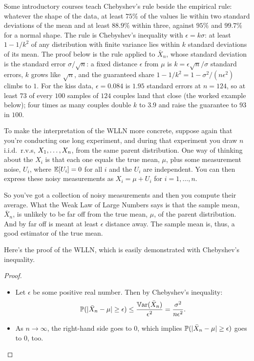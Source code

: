 \begin{bridge}
Some introductory courses teach Chebyshev's rule beside the empirical rule: whatever the shape of the data, at least $75\%$ of the values lie within two standard deviations of the mean and at least $88.9\%$ within three, against $95\%$ and $99.7\%$ for a normal shape.
The rule is Chebyshev's inequality with $\epsilon = k\sigma$: at least $1 - 1/k^2$ of any distribution with finite variance lies within $k$ standard deviations of its mean.
The proof below is the rule applied to $\bar{X}_n$, whose standard deviation is the standard error $\sigma/\sqrt{n}$: a fixed distance $\epsilon$ from $\mu$ is $k = \epsilon\sqrt{n}/\sigma$ standard errors, $k$ grows like $\sqrt{n}$, and the guaranteed share $1 - 1/k^2 = 1 - \sigma^2/(n\epsilon^2)$ climbs to $1$.
For the kiss data, $\epsilon = 0.084$ is $1.95$ standard errors at $n = 124$, so at least $73$ of every $100$ samples of $124$ couples land that close (the worked example below); four times as many couples double $k$ to $3.9$ and raise the guarantee to $93$ in $100$.
\end{bridge}

To make the interpretation of the WLLN more concrete, suppose again that you're conducting one long experiment, and during that experiment you draw $n$ i.i.d.\ r.v.s, $X_1, \ldots, X_n$, from the same parent distribution.
One way of thinking about the $X_i$ is that each one equals the true mean, $\mu$, plus some measurement noise, $U_i$, where $\operatorname*{\mathbb{E}}[U_i] = 0$ for all $i$ and the $U_i$ are independent.
You can then express these noisy measurements as $X_i = \mu + U_i$ for $i = 1, \ldots, n$.

So you've got a collection of noisy measurements and then you compute their average.
What the Weak Law of Large Numbers says is that the sample mean, $\bar{X}_n$, is unlikely to be far off from the true mean, $\mu$, of the parent distribution.
And by far off is meant at least $\epsilon$ distance away.
The sample mean is, thus, a good estimator of the true mean.

Here's the proof of the WLLN, which is easily demonstrated with Chebyshev's inequality.

\begin{proof}
\leavevmode %
\begin{itemize}

\item Let $\epsilon$ be some positive real number.
Then by Chebyshev's inequality:
\[
\mathbb{P}(\lvert\bar{X}_n - \mu\rvert \geq \epsilon) \leq \frac{\operatorname*{\mathbb{V}\text{ar}}(\bar{X}_n)}{\epsilon^2} = \frac{\sigma^2}{n \epsilon^2}.
\]

\item As $n \to \infty$, the right-hand side goes to 0, which implies $\mathbb{P}(\lvert\bar{X}_n - \mu\rvert \geq \epsilon)$ goes to 0, too.
\end{itemize}
\end{proof}

